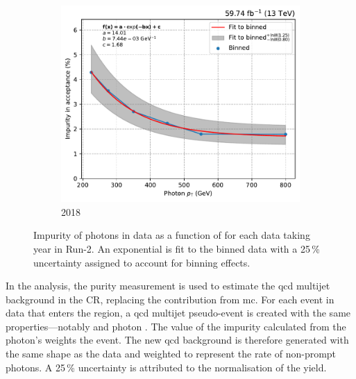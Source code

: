 \begin{figure}[htbp]
    \hfill
    \begin{subfigure}[b]{0.32\textwidth}
        \includegraphics[width=\textwidth]{figures/photon_purity/2018/impurity_plot_2018.pdf}
        \caption{2018}
    \end{subfigure}
    \caption[Impurity of photons in data as a function of \pt for each data taking year in Run-2]{Impurity of photons in data as a function of \pt for each data taking year in Run-2. An exponential is fit to the binned data with a 25\,\% uncertainty assigned to account for binning effects.}
    \label{fig:htoinv_photon_impurity}
\end{figure}


In the analysis, the purity measurement is used to estimate the \acrshort{qcd} multijet background in the \singlePhotonCr \gls{CR}, replacing the contribution from \acrshort{mc}. For each event in data that enters the region, a \acrshort{qcd} multijet pseudo-event is created with the same properties---notably \ptmiss and photon \pt. The value of the impurity calculated from the photon's \pt weights the event. The new \acrshort{qcd} background is therefore generated with the same shape as the data and weighted to represent the rate of non-prompt photons. A 25\,\% uncertainty is attributed to the normalisation of the yield.



